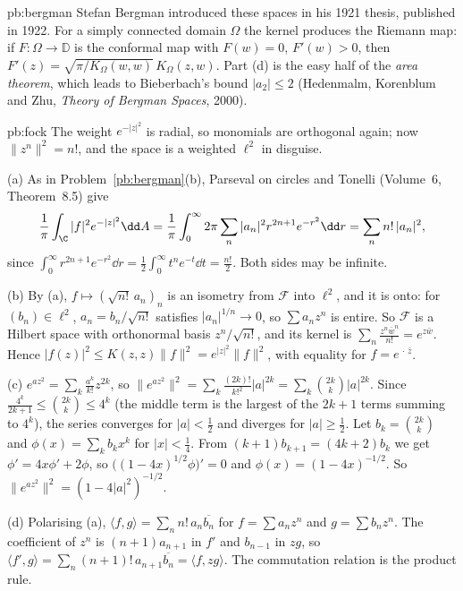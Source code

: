\begin{solution}{pb:bergman}
\leads Stefan Bergman introduced these spaces in his 1921 thesis, published in 1922. For a simply connected domain $\Omega$ the kernel produces the Riemann map: if $F:\Omega\to\mathbb D$
is the conformal map with $F(w)=0$, $F'(w)>0$, then $F'(z)=\sqrt{\pi/K_\Omega(w,w)}\,K_\Omega(z,w)$. Part (d) is the easy half of the \emph{area theorem}, which leads to
Bieberbach's bound $|a_2|\le2$ (Hedenmalm, Korenblum and Zhu, \emph{Theory of Bergman Spaces}, 2000).
\end{solution}

\begin{solution}{pb:fock}
\idea The weight $e^{-|z|^2}$ is radial, so monomials are orthogonal again; now $\|z^n\|^2=n!$, and the space is a weighted $\ell^2$ in disguise.

\writeup (a) As in Problem~\ref{pb:bergman}(b), Parseval on circles and Tonelli (Volume~6, Theorem~8.5) give
\[
\frac1\pi\int_\C|f|^2e^{-|z|^2}\dd A=\frac1\pi\int_0^\infty2\pi\sum_n|a_n|^2r^{2n+1}e^{-r^2}\dd r=\sum_nn!\,|a_n|^2,
\]
since $\int_0^\infty r^{2n+1}e^{-r^2}\dd r=\frac12\int_0^\infty t^ne^{-t}\dd t=\frac{n!}2$. Both sides may be infinite.

(b) By (a), $f\mapsto(\sqrt{n!}\,a_n)_n$ is an isometry from $\mathcal F$ into $\ell^2$, and it is onto: for $(b_n)\in\ell^2$, $a_n=b_n/\sqrt{n!}$ satisfies $|a_n|^{1/n}\to0$, so
$\sum a_nz^n$ is entire. So $\mathcal F$ is a Hilbert space with orthonormal basis $z^n/\sqrt{n!}$, and its kernel is $\sum_n\frac{z^n\bar w^n}{n!}=e^{z\bar w}$. Hence
$|f(z)|^2\le K(z,z)\|f\|^2=e^{|z|^2}\|f\|^2$, with equality for $f=e^{\,\cdot\,\bar z}$.

(c) $e^{az^2}=\sum_k\frac{a^k}{k!}z^{2k}$, so $\|e^{az^2}\|^2=\sum_k\frac{(2k)!}{k!^2}|a|^{2k}=\sum_k\binom{2k}k|a|^{2k}$. Since $\frac{4^k}{2k+1}\le\binom{2k}k\le4^k$ (the middle term is
the largest of the $2k+1$ terms summing to $4^k$), the series converges for $|a|<\frac12$ and diverges for $|a|\ge\frac12$. Let $b_k=\binom{2k}k$ and $\phi(x)=\sum_kb_kx^k$ for $|x|<\frac14$. From $(k+1)b_{k+1}=(4k+2)b_k$ we get $\phi'=4x\phi'+2\phi$, so
$\bigl((1-4x)^{1/2}\phi\bigr)'=0$ and $\phi(x)=(1-4x)^{-1/2}$. So $\|e^{az^2}\|^2=(1-4|a|^2)^{-1/2}$.

(d) Polarising (a), $\langle f,g\rangle=\sum_nn!\,a_n\overline{b_n}$ for $f=\sum a_nz^n$ and $g=\sum b_nz^n$. The coefficient of $z^n$ is $(n+1)a_{n+1}$ in $f'$ and $b_{n-1}$ in $zg$, so
$\langle f',g\rangle=\sum_n(n+1)!\,a_{n+1}\overline{b_n}=\langle f,zg\rangle$. The commutation relation is the product rule.


\end{solution}
